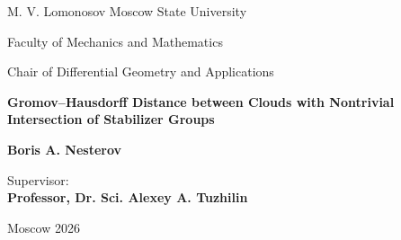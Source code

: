 
\begin{center}
    \small
    M. V. Lomonosov Moscow State University
    \vspace{1.5cm}

    Faculty of Mechanics and Mathematics

    \vspace{0.5cm}

    Chair of Differential Geometry and Applications
    \vspace{2cm}

    \vspace{1cm}

    \Large
    \textbf{Gromov--Hausdorff Distance between Clouds with Nontrivial
    Intersection of Stabilizer Groups}
\end{center}

\vspace{2cm}

\begin{flushright}
    \normalsize
    \textbf{Boris A. Nesterov}

    \vspace{0.5cm}

    \vspace{1cm}

    Supervisor:\\
    \textbf{Professor, Dr. Sci. Alexey A. Tuzhilin}

    \vspace{0.5cm}
\end{flushright}

\vfill

\begin{center}
    \normalsize
    Moscow 2026
\end{center}
